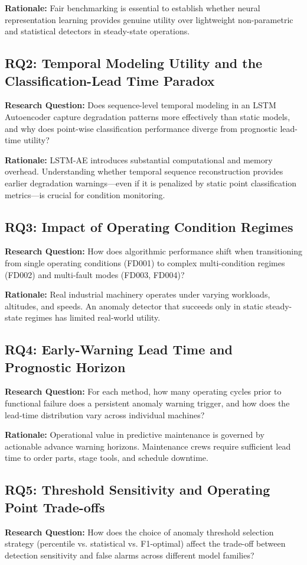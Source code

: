 \documentclass[12pt,a4paper,oneside]{report}
\begin{document}
\textbf{Rationale:} Fair benchmarking is essential to establish whether neural representation learning provides genuine utility over lightweight non-parametric and statistical detectors in steady-state operations.

\subsection{RQ2: Temporal Modeling Utility and the Classification-Lead Time Paradox}
\textbf{Research Question:} Does sequence-level temporal modeling in an LSTM Autoencoder capture degradation patterns more effectively than static models, and why does point-wise classification performance diverge from prognostic lead-time utility?

\textbf{Rationale:} LSTM-AE introduces substantial computational and memory overhead. Understanding whether temporal sequence reconstruction provides earlier degradation warnings—even if it is penalized by static point classification metrics—is crucial for condition monitoring.

\subsection{RQ3: Impact of Operating Condition Regimes}
\textbf{Research Question:} How does algorithmic performance shift when transitioning from single operating conditions (FD001) to complex multi-condition regimes (FD002) and multi-fault modes (FD003, FD004)?

\textbf{Rationale:} Real industrial machinery operates under varying workloads, altitudes, and speeds. An anomaly detector that succeeds only in static steady-state regimes has limited real-world utility.

\subsection{RQ4: Early-Warning Lead Time and Prognostic Horizon}
\textbf{Research Question:} For each method, how many operating cycles prior to functional failure does a persistent anomaly warning trigger, and how does the lead-time distribution vary across individual machines?

\textbf{Rationale:} Operational value in predictive maintenance is governed by actionable advance warning horizons. Maintenance crews require sufficient lead time to order parts, stage tools, and schedule downtime.

\subsection{RQ5: Threshold Sensitivity and Operating Point Trade-offs}
\textbf{Research Question:} How does the choice of anomaly threshold selection strategy (percentile vs. statistical vs. F1-optimal) affect the trade-off between detection sensitivity and false alarms across different model families?
\end{document}

